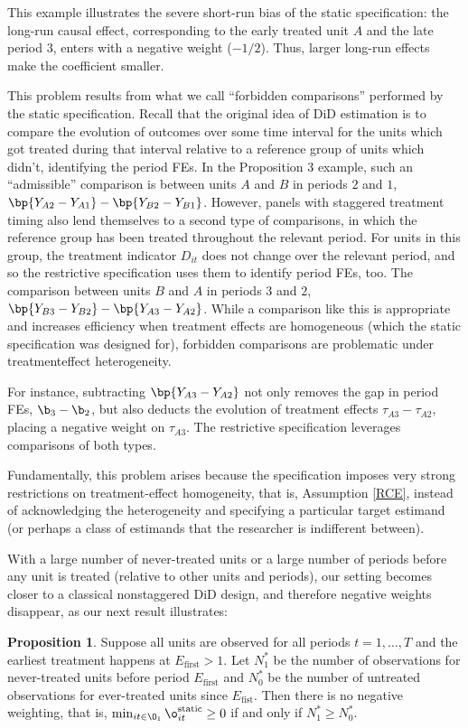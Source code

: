 \documentclass[12pt]{article}
\theoremstyle{definition}
\newtheorem{proposition}{Proposition}
\begin{document}
This example illustrates the severe short-run bias of the static specification: the long-run causal effect, corresponding to the early treated unit $A$ and the late period $3$, enters with a negative weight ($-1/2$). Thus, larger long-run effects make the coefficient smaller.

This problem results from what we call ``forbidden comparisons'' performed by the static specification. Recall that the original idea of DiD estimation is to compare the evolution of outcomes over some time interval for the units which got treated during that interval relative to a reference group of units which didn't, identifying the period FEs. In the Proposition 3 example, such an ``admissible'' comparison is between units $A$ and $B$ in periods $2$ and $1$, $\bp{Y_{A2} - Y_{A1}} - \bp{Y_{B2} - Y_{B1}}$. However, panels with staggered treatment timing also lend themselves to a second type of comparisons, in which the reference group has been treated throughout the relevant period. For units in this group, the treatment indicator $D_{it}$ does not change over the relevant period, and so the restrictive specification uses them to identify period FEs, too. The comparison between units $B$ and $A$ in periods $3$ and $2$, $\bp{Y_{B3} - Y_{B2}} - \bp{Y_{A3} - Y_{A2}}$. While a comparison like this is appropriate and increases efficiency when treatment effects are homogeneous (which the static specification was designed for), forbidden comparisons are problematic under treatmenteffect heterogeneity.

For instance, subtracting $\bp{Y_{A3} - Y_{A2}}$ not only removes the gap in period FEs, $\b_3 - \b_2$, but also deducts the evolution of treatment effects $\tau_{A3} - \tau_{A2}$, placing a negative weight on $\tau_{A3}$. The restrictive specification leverages comparisons of both types.

Fundamentally, this problem arises because the specification imposes very strong restrictions on treatment-effect homogeneity, that is, Assumption \ref{RCE}, instead of acknowledging the heterogeneity and specifying a particular target estimand (or perhaps a class of estimands that the researcher is indifferent between).

With a large number of never-treated units or a large number of periods before any unit is treated (relative to other units and periods), our setting becomes closer to a classical nonstaggered DiD design, and therefore negative weights disappear, as our next result illustrates:

\begin{proposition}
    Suppose all units are observed for all periods $t = 1, \ldots, T$ and the earliest treatment happens at $E_{\text{first}}>1$. Let $N_1^*$ be the number of observations for never-treated units before period $E_{\text{first}}$ and $N_0^*$ be the number of untreated observations for ever-treated units since $E_{\text{fist}}$. Then there is no negative weighting, that is, $\min_{it \in \O_1} \o_{it}^{\text{static}} \geq 0$ if and only if $N_1^* \geq N_0^*$.
\end{proposition}
\end{document}

